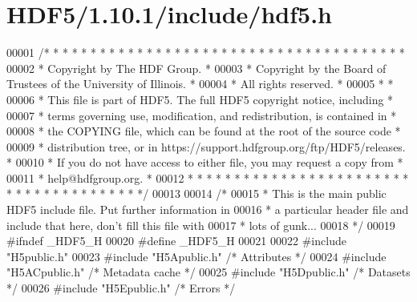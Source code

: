 \hypertarget{_h_d_f5_21_810_81_2include_2hdf5_8h_source}{}\section{H\+D\+F5/1.10.1/include/hdf5.h}
\label{_h_d_f5_21_810_81_2include_2hdf5_8h_source}

\begin{DoxyCode}
00001 \textcolor{comment}{/* * * * * * * * * * * * * * * * * * * * * * * * * * * * * * * * * * * * * * *}
00002 \textcolor{comment}{ * Copyright by The HDF Group.                                               *}
00003 \textcolor{comment}{ * Copyright by the Board of Trustees of the University of Illinois.         *}
00004 \textcolor{comment}{ * All rights reserved.                                                      *}
00005 \textcolor{comment}{ *                                                                           *}
00006 \textcolor{comment}{ * This file is part of HDF5.  The full HDF5 copyright notice, including     *}
00007 \textcolor{comment}{ * terms governing use, modification, and redistribution, is contained in    *}
00008 \textcolor{comment}{ * the COPYING file, which can be found at the root of the source code       *}
00009 \textcolor{comment}{ * distribution tree, or in https://support.hdfgroup.org/ftp/HDF5/releases.  *}
00010 \textcolor{comment}{ * If you do not have access to either file, you may request a copy from     *}
00011 \textcolor{comment}{ * help@hdfgroup.org.                                                        *}
00012 \textcolor{comment}{ * * * * * * * * * * * * * * * * * * * * * * * * * * * * * * * * * * * * * * */}
00013 
00014 \textcolor{comment}{/*}
00015 \textcolor{comment}{ * This is the main public HDF5 include file.  Put further information in}
00016 \textcolor{comment}{ * a particular header file and include that here, don't fill this file with}
00017 \textcolor{comment}{ * lots of gunk...}
00018 \textcolor{comment}{ */}
00019 \textcolor{preprocessor}{#ifndef \_HDF5\_H}
00020 \textcolor{preprocessor}{#define \_HDF5\_H}
00021 
00022 \textcolor{preprocessor}{#include "H5public.h"}
00023 \textcolor{preprocessor}{#include "H5Apublic.h"}      \textcolor{comment}{/* Attributes               */}
00024 \textcolor{preprocessor}{#include "H5ACpublic.h"}     \textcolor{comment}{/* Metadata cache           */}
00025 \textcolor{preprocessor}{#include "H5Dpublic.h"}      \textcolor{comment}{/* Datasets             */}
00026 \textcolor{preprocessor}{#include "H5Epublic.h"}      \textcolor{comment}{/* Errors               */}

\end{DoxyCode}
